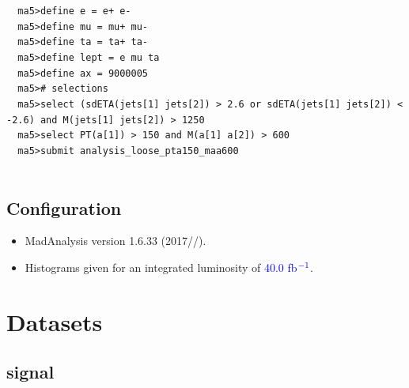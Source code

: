 \documentclass[a4paper, 10pt]{article}
\begin{document}
\texttt{ }\texttt{ }\texttt{ma5>define e = e+ e-\\
}
\texttt{ }\texttt{ }\texttt{ma5>define mu = mu+ mu-\\
}
\texttt{ }\texttt{ }\texttt{ma5>define ta = ta+ ta-\\
}
\texttt{ }\texttt{ }\texttt{ma5>define lept = e mu ta\\
}
\texttt{ }\texttt{ }\texttt{ma5>define ax = 9000005\\
}
\texttt{ }\texttt{ }\texttt{ma5>\# selections\\
}
\texttt{ }\texttt{ }\texttt{ma5>select (sdETA(jets[1] jets[2]) > 2.6 or sdETA(jets[1] jets[2]) < -2.6) and M(jets[1] jets[2]) > 1250\\
}
\texttt{ }\texttt{ }\texttt{ma5>select PT(a[1]) > 150 and M(a[1] a[2]) > 600\\
}
\texttt{ }\texttt{ }\texttt{ma5>submit analysis\_loose\_pta150\_maa600\\
}
\texttt{ }\texttt{ }\subsection{ Configuration}

\begin{itemize}
  \item MadAnalysis version 1.6.33 (2017//).
   \item Histograms given for an integrated luminosity of \textcolor{blue}{40.0}\textcolor{blue}{ fb}$^{\textcolor{blue}{-1}}$\textcolor{blue}{.}
\textcolor{blue}{}
\end{itemize}
\newpage
\section{ Datasets}

\subsection{ signal}
\end{document}
